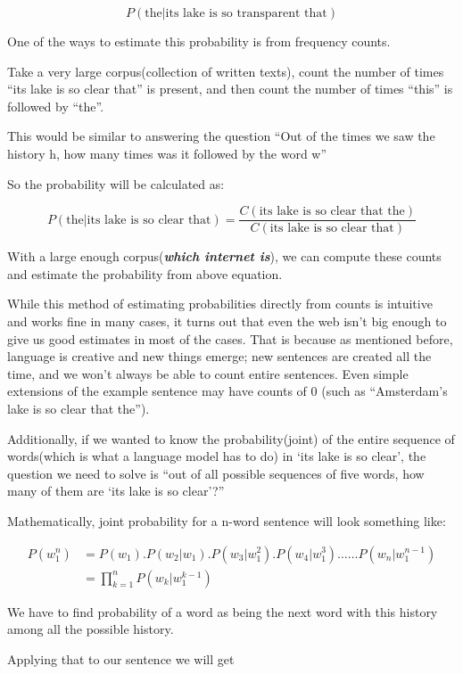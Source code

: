\documentclass[11pt]{article}
\begin{document}
\[ P (\text{the} | \text{its lake is so transparent that})\]

One of the ways to estimate this probability is from frequency counts.

Take a very large corpus(collection of written texts), count the number
of times ``its lake is so clear that'' is present, and then count the
number of times ``this'' is followed by ``the''.

This would be similar to answering the question ``Out of the times we
saw the history h, how many times was it followed by the word w''

So the probability will be calculated as:

\[ P(\text{the}|\text{its lake is so clear that}) = \frac{C(\text{its lake is so clear that the})}{C(\text{its lake is so clear that})} \]

With a large enough corpus(\textbf{\emph{which internet is}}), we can
compute these counts and estimate the probability from above equation.

While this method of estimating probabilities directly from counts is
intuitive and works fine in many cases, it turns out that even the web
isn't big enough to give us good estimates in most of the cases. That is
because as mentioned before, language is creative and new things emerge;
new sentences are created all the time, and we won't always be able to
count entire sentences. Even simple extensions of the example sentence
may have counts of 0 (such as ``Amsterdam's lake is so clear that
the'').

Additionally, if we wanted to know the probability(joint) of the entire
sequence of words(which is what a language model has to do) in `its lake
is so clear', the question we need to solve is ``out of all possible
sequences of five words, how many of them are `its lake is so clear'?''

Mathematically, joint probability for a n-word sentence will look
something like:

\[ \begin{align} P(w_1^n) &= P(w_1).P(w_2 | w_1).P(w_3 | w_1^2).P(w_4 | w_1^3) \dots\dots P(w_n | w_1^{n-1})\\ &= \prod_{k=1}^{n}P(w_k|w_1^{k-1}) \end{align} \]

We have to find probability of a word as being the next word with this
history among all the possible history.

Applying that to our sentence we will get
\end{document}
